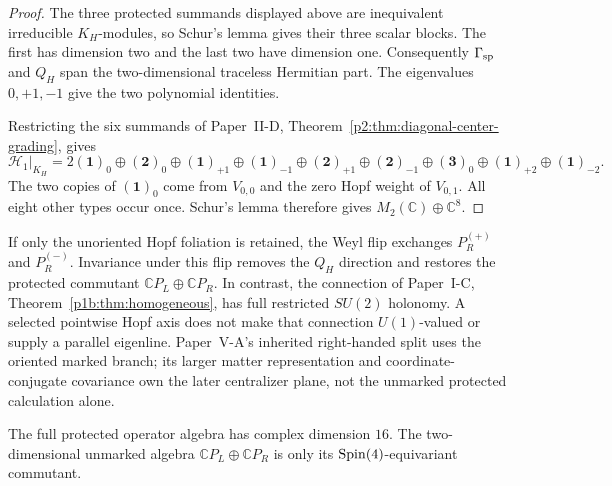 \documentclass[12pt,a4paper]{article}
\begin{document}
\begin{proof}
The three protected summands displayed above are inequivalent irreducible
\(K_H\)-modules, so Schur's lemma gives their three scalar blocks.
The first has dimension two and the last two have dimension one.
Consequently \(\Gamma_{\rm sp}\) and \(Q_H\) span the two-dimensional
traceless Hermitian part.  The eigenvalues \(0,+1,-1\) give the two
polynomial identities.

Restricting the six summands of Paper~II-D,
Theorem~\ref{p2:thm:diagonal-center-grading}, gives
\[
 \mathcal H_1|_{K_H}
 =2(\mathbf1)_0\oplus(\mathbf2)_0
 \oplus(\mathbf1)_{+1}\oplus(\mathbf1)_{-1}
 \oplus(\mathbf2)_{+1}\oplus(\mathbf2)_{-1}
 \oplus(\mathbf3)_0
 \oplus(\mathbf1)_{+2}\oplus(\mathbf1)_{-2}.
\]
The two copies of \((\mathbf1)_0\) come from \(V_{0,0}\) and the
zero Hopf weight of \(V_{0,1}\).  All eight other types occur once.
Schur's lemma therefore gives \(M_2(\mathbb C)\oplus\mathbb C^8\).
\end{proof}

\begin{remark}
\label{p2e:rem:marked-commutant-versus-holonomy}
If only the unoriented Hopf foliation is retained, the Weyl flip exchanges
\(P_R^{(+)}\) and \(P_R^{(-)}\).  Invariance under this flip removes
the \(Q_H\) direction and restores the protected commutant
\(\mathbb CP_L\oplus\mathbb CP_R\).  In contrast, the connection of
Paper~I-C, Theorem~\ref{p1b:thm:homogeneous}, has full restricted
\(SU(2)\) holonomy.  A selected pointwise Hopf axis does not make that
connection \(U(1)\)-valued or supply a parallel eigenline.  Paper~V-A's
inherited right-handed split uses the oriented marked branch; its larger
matter representation and coordinate-conjugate covariance own the later
centralizer plane, not the unmarked protected calculation alone.
\end{remark}

\begin{remark}
\label{p2:rem:protected-fierz-versus-commutant}
The full protected operator algebra has complex dimension \(16\).  The
two-dimensional unmarked algebra
\(\mathbb CP_L\oplus\mathbb CP_R\) is only its \(\mathrm{Spin}(4)\)-equivariant
commutant.
\end{remark}
\end{document}
